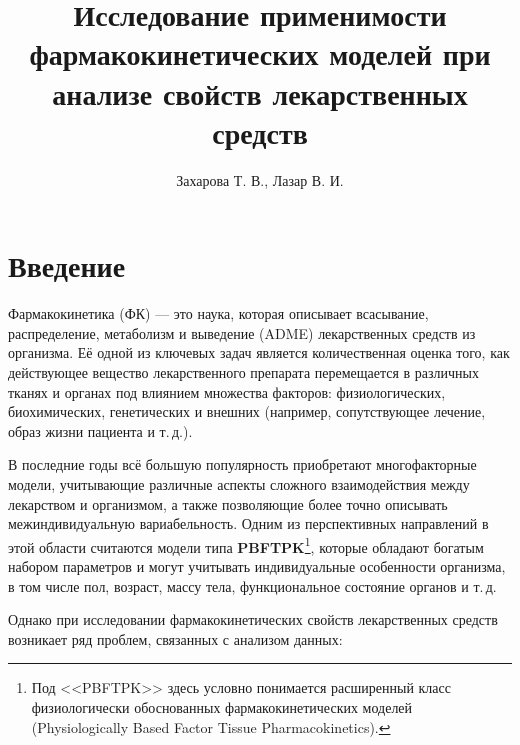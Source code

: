 \documentclass[12pt]{article}
\author{Захарова Т. В., Лазар В. И.}
\title{Исследование применимости фармакокинетических моделей при анализе свойств лекарственных средств}
\begin{document}
\maketitle

\tableofcontents

\newpage

\section{Введение}

Фармакокинетика (ФК) — это наука, которая описывает всасывание, распределение, метаболизм и выведение (ADME) лекарственных средств из организма. Её одной из ключевых задач является количественная оценка того, как действующее вещество лекарственного препарата перемещается в различных тканях и органах под влиянием множества факторов: физиологических, биохимических, генетических и внешних (например, сопутствующее лечение, образ жизни пациента и т.\,д.).

В последние годы всё большую популярность приобретают многофакторные модели, учитывающие различные аспекты сложного взаимодействия между лекарством и организмом, а также позволяющие более точно описывать межиндивидуальную вариабельность. Одним из перспективных направлений в этой области считаются модели типа \textbf{PBFTPK}\footnote{Под <<PBFTPK>> здесь условно понимается расширенный класс физиологически обоснованных фармакокинетических моделей (Physiologically Based Factor Tissue Pharmacokinetics).}, которые обладают богатым набором параметров и могут учитывать индивидуальные особенности организма, в том числе пол, возраст, массу тела, функциональное состояние органов и т.\,д.

Однако при исследовании фармакокинетических свойств лекарственных средств возникает ряд проблем, связанных с анализом данных:
\end{document}

